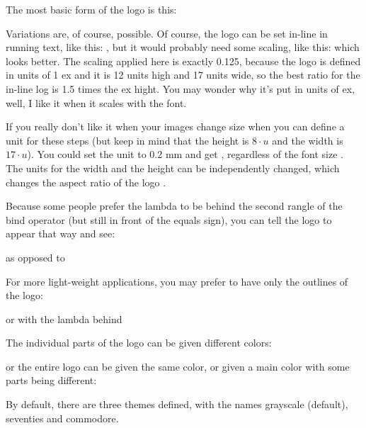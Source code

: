 \documentclass{article}
\begin{document}
The most basic form of the logo is this:

\noindent
\haskelllogo

\noindent
Variations are, of course, possible.
Of course, the logo can be set in-line in running text, like this: \haskelllogo, but it would probably need some scaling, like this: \haskelllogo[scale=.125] which looks better.
The scaling applied here is exactly 0.125, because the logo is defined in units of 1 ex and it is 12 units high and 17 units wide, so the best ratio for the in-line log is 1.5 times the ex hight.
You may wonder why it's put in units of ex, well, I like it when it {\small \haskelllogo[scale=.125] scales \large \haskelllogo[scale=.125] with \huge \haskelllogo[scale=.125] the font}.

If you really don't like it when your images change size when you can define a unit for these steps (but keep in mind that the height is $8\cdot u$ and the width is $17\cdot u$).
You could set the unit to 0.2 mm and get \haskelllogo[unit=0.2mm], regardless of the {\large font size \haskelllogo[unit=0.2mm]}.
The units for the width and the height can be independently changed, which changes the aspect ratio of the logo \haskelllogo[xunit=1mm,yunit=.2mm].

Because some people prefer the lambda to be behind the second rangle of the bind operator (but still in front of the equals sign), you can tell the logo to appear that way and see:

\noindent
\haskelllogo[lambdabehind] as opposed to \haskelllogo

For more light-weight applications, you may prefer to have only the outlines of the logo:

\noindent
\haskelllogo[outlines] or with the lambda behind 

The individual parts of the logo can be given different colors:

\noindent
\haskelllogo[lambdabehind,
	first  rangle color=green,
	second rangle color=red,
	lambda        color=yellow,
	upper  equals color=black,
	lower  equals color=blue
]

\noindent or the entire logo can be given the same color, or given a main color with some parts being different:

\noindent
\haskelllogo[logo color=red]
\haskelllogo[logo color=red,upper equals color=blue]

By default, there are three themes defined, with the names grayscale (default), seventies and commodore.
\end{document}
